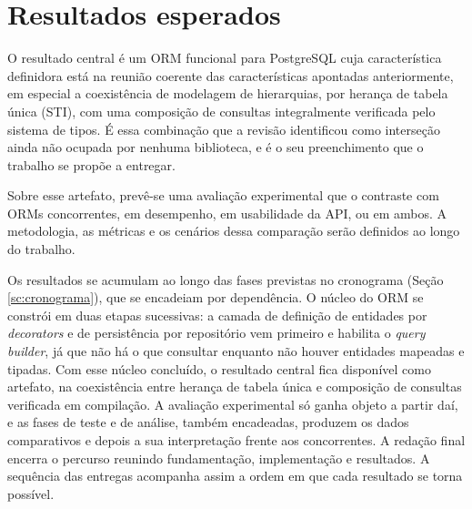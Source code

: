 \newpage
\section{Resultados esperados}
\label{sc:resultados}

O resultado central é um ORM funcional para PostgreSQL cuja característica definidora está na reunião coerente das características apontadas anteriormente, em especial a coexistência de modelagem de hierarquias, por herança de tabela única (STI), com uma composição de consultas integralmente verificada pelo sistema de tipos. É essa combinação que a revisão identificou como interseção ainda não ocupada por nenhuma biblioteca, e é o seu preenchimento que o trabalho se propõe a entregar.

Sobre esse artefato, prevê-se uma avaliação experimental que o contraste com ORMs concorrentes, em desempenho, em usabilidade da API, ou em ambos. A metodologia, as métricas e os cenários dessa comparação serão definidos ao longo do trabalho.

Os resultados se acumulam ao longo das fases previstas no cronograma (Seção \ref{sc:cronograma}), que se encadeiam por dependência. O núcleo do ORM se constrói em duas etapas sucessivas: a camada de definição de entidades por \emph{decorators} e de persistência por repositório vem primeiro e habilita o \emph{query builder}, já que não há o que consultar enquanto não houver entidades mapeadas e tipadas. Com esse núcleo concluído, o resultado central fica disponível como artefato, na coexistência entre herança de tabela única e composição de consultas verificada em compilação. A avaliação experimental só ganha objeto a partir daí, e as fases de teste e de análise, também encadeadas, produzem os dados comparativos e depois a sua interpretação frente aos concorrentes. A redação final encerra o percurso reunindo fundamentação, implementação e resultados. A sequência das entregas acompanha assim a ordem em que cada resultado se torna possível.
